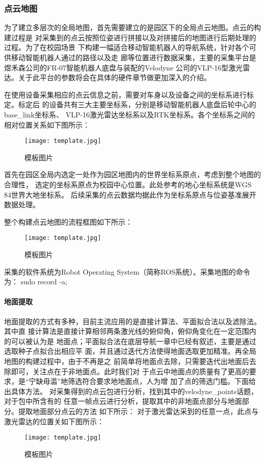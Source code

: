 \subsubsection{点云地图}
为了建立多层次的全局地图，首先需要建立的是园区下的全局点云地图。点云的构建过程是
对采集到的点云按照位姿进行拼接以及对拼接后的地图进行后期处理的过程。为了在校园场景
下构建一幅适合移动智能机器人的导航系统，针对各个可供移动智能机器人通过的路径以及走
廊等位置进行数据采集，主要的采集平台是煜禾森公司的FR-07智能机器人底盘与装配的Velodyne
公司的VLP-16型激光雷达。关于此平台的参数将会在具体的硬件章节做更加深入的介绍。

在使用设备采集相应的点云信息之前，需要对车身以及设备之间的坐标系进行标定。标定后
的设备共有三大主要坐标系，分别是移动智能机器人底盘后轮中心的base\_link坐标系、
VLP-16激光雷达坐标系以及RTK坐标系。各个坐标系之间的相对位置关系如下图所示：
\begin{figure}[ht]
    \centering
    \texttt{[image: template.jpg]}
    \caption{模板图片}
\end{figure}

首先在园区全局内选定一处作为园区地图内的世界坐标系原点，考虑到整个地图的合理性，
选定的坐标系原点为校园中心位置。此处参考的地心坐标系统是WGS 84世界大地坐标系。
后续采集的点云数据均据此作为坐标系原点与位姿基准展开数据处理。

整个构建点云地图的流程框图如下所示：
\begin{figure}[ht]
    \centering
    \texttt{[image: template.jpg]}
    \caption{模板图片}
\end{figure}

采集的软件系统为Robot Operating System（简称ROS系统）。采集地图的命令为：
sudo record -a;

\paragraph{地面提取}
地面提取的方式有多种，目前主流应用的是直接计算法、平面拟合法以及滤除法。其中直
接计算法是直接计算相邻两条激光线的俯仰角，俯仰角变化在一定范围内的可以被认为是
地面点；平面拟合法在底层导航一章中已经有叙述，主要是通过选取种子点拟合出相应平
面，并且通过迭代方法使得地面选取更加精准。再全局地图的构建过程中，由于不再是之
前简单将地面点去除，只需要迭代出地面后去除即可，关注点在于非地面点。此时我们对
于点云中地面点的质量有了更高的要求，是“宁缺毋滥”地筛选符合要求地地面点，人为增
加了点的筛选门槛。下面给出具体方法。
对采集得到的点云包进行分析，找到其中的velodyne\_points话题，对于包中所含有的
任意一帧点云进行分析，提取其中的非地面点部分与地面部分。提取地面部分点云的方法
如下所示：
对于激光雷达采到的任意一点，此点与激光雷达的位置关如下图所示：
\begin{figure}[ht]
    \centering
    \texttt{[image: template.jpg]}
    \caption{模板图片}
\end{figure}

